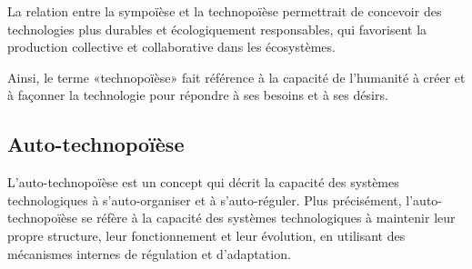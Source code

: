 
La relation entre la sympoïèse et la technopoïèse permettrait de concevoir des technologies plus durables et écologiquement responsables, qui favorisent la production collective et collaborative dans les écosystèmes.

Ainsi, le terme «technopoïèse» fait référence à la capacité de l'humanité à créer et à façonner la technologie pour répondre à ses besoins et à ses désirs. 

\subsection{Auto-technopoïèse}



L'auto-technopoïèse est un concept qui décrit la capacité des systèmes technologiques à s'auto-organiser et à s'auto-réguler. Plus précisément, l'auto-technopoïèse se réfère à la capacité des systèmes technologiques à maintenir leur propre structure, leur fonctionnement et leur évolution, en utilisant des mécanismes internes de régulation et d'adaptation.




